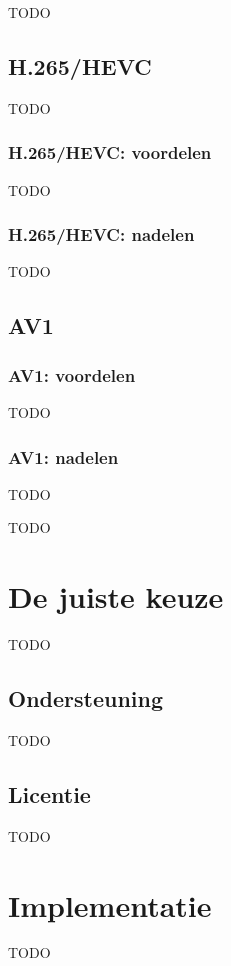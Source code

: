 TODO

\subsection{H.265/HEVC}
\label{sec:videocompressie-h265}

TODO

\subsubsection{H.265/HEVC: voordelen}
\label{sec:videocompressie-h265-voordelen}

TODO

\subsubsection{H.265/HEVC: nadelen}
\label{sec:videocompressie-h265-nadelen}

TODO

\subsection{AV1}
\label{sec:videocompressie-av1}

\subsubsection{AV1: voordelen}
\label{sec:videocompressie-av1-voordelen}

TODO

\subsubsection{AV1: nadelen}
\label{sec:videocompressie-av1-nadelen}

TODO

TODO

\section{De juiste keuze}
\label{sec:videocompressie-keuze}

TODO

\subsection{Ondersteuning}
\label{sec:videocompressie-ondersteuning}

TODO

\subsection{Licentie}
\label{sec:videocompressie-licentie}

TODO

\section{Implementatie}
\label{sec:videocompressie-implementatie}

TODO
